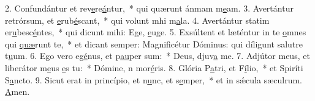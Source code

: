 2. Confundántur et rev\uline{e}re\uline{á}ntur,~* qui quærunt ánmam m\uline{e}am.
3. Avertántur retrórsum, et \uline{e}rub\uline{é}scant,~* qui volunt mhi m\uline{a}la.
4. Avertántur statim er\uline{u}besc\uline{é}ntes,~* qui dicunt mihi: Ege, \uline{e}uge.
5. Exsúltent et læténtur in te \uline{o}mnes qui \uline{quæ}runt te,~* et dicant semper: Magnificétur Dóminus: qui díligunt salutre t\uline{u}um.
6. Ego vero eg\uline{é}nus, et p\uline{au}per sum:~* Deus, djuv\uline{a} me.
7. Adjútor meus, et liberátor m\uline{e}us \uline{e}s tu:~* Dómine, n mor\uline{é}ris.
8. Glória P\uline{a}tri, et F\uline{í}lio,~* et Spiríti S\uline{a}ncto.
9. Sicut erat in princípio, et n\uline{u}nc, et s\uline{e}mper,~* et in sǽcula sæculrum. \uline{A}men.
